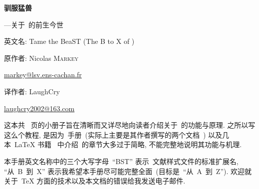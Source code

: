 \documentclass{article}
\begin{document}
\SetDate[\ttbdate]
\setcounter{parttocdepth}{3}
\doparttoc


\begin{center}
{\Huge\bfseries 驯服猛兽}
\par\bigskip
{\Large ---关于~\bt 的前生今世}
\par\bigskip
{\large 英文名: Tame the BeaST (The B to X of \bt)} 
\par\bigskip
原作者: Nicolas \textsc{Markey} 
\par
\href{mailto:markey@lsv.ens-cachan.fr}{markey@lsv.ens-cachan.fr}
\par\bigskip
译作者: LaughCry
\par
\href{mailto:laughcry2002@163.com}{laughcry2002@163.com}
\end{center}
\vfil\vfil
\begin{center}
\vfil
\begin{minipage}{.8\textwidth}
\indent 这本共~\pageref{LastPage} 页的小册子旨在清晰而又详尽地向读者介绍关于~\bt 的功能与原理.
之所以写这么个教程, 是因为~\bt 手册~(实际上主要是其作者撰写的两个文档~\cite{btxdoc,btxhak}) 以及几本~\LaTeX{} 书籍~\cite[...]{latex:dps,latex:lc,latex:lc2} 中介绍~\bt 的章节大多过于简略, 不能完整地说明其功能与机理.

\indent 本手册英文名称中的三个大写字母~``BST'' 表示~\bt 文献样式文件的标准扩展名, ``从~B~到~X'' 表示我希望本手册尽可能完整全面~(目标是~``从~A~到~Z''). 欢迎就关于~\TeX{} 方面的技术以及本文档的错误给我发送电子邮件.
\end{minipage}
\end{center}
\vfil\vfil
\begin{center}
\begin{minipage}{.8\textwidth}
\tableofcontents
\end{minipage}
\end{center}
\vfil




%
%
%
\end{document}
